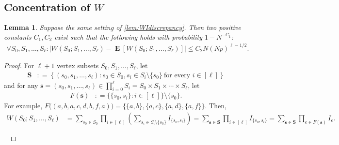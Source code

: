 \documentclass[letterpaper,11pt]{article}
\newtheorem{lemma}[theorem]{Lemma}
\newcommand{\W}{W}
\newcommand{\Ind}{I}
\newcommand{\Vsize}{N}
\newcommand{\pmax}{p}
\newcommand{\Slc}{\mathbf{S}}
\newcommand{\Vs}{U}
\newcommand{\Es}{F}
\DeclareMathOperator{\E}{\mathbf{E}}
\def\defeq{\mathrel{\mathop:}=}%
\begin{document}
\subsection[Concentration of W]{Concentration of $W$} \label{sec:W-EW}
%
\begin{lemma}
\label{lem:WEWdiscrepancy}
Suppose the same setting of \cref{lem:WIdiscrepancy}.
%
Then two positive constants $C_1, C_2$ exist such that the following holds with probability $1-\Vsize^{-C_1}$: 
\begin{align*}
\forall S_0, S_1, \ldots, S_\ell: 
\bigl|\W(S_0;S_1,\ldots,S_\ell)-\E[\W(S_0;S_1,\ldots,S_\ell)]\bigr|\leq  C_2 \Vsize(\Vsize \pmax)^{\ell-1/2}.
\end{align*}
\end{lemma}
\begin{proof}
For $\ell+1$ vertex subsets $S_0, S_1, \ldots, S_\ell$, let
\begin{align*}
\Slc&\defeq\left\{(s_0,s_1,\ldots,s_\ell): s_0\in S_0, s_i \in S_i\setminus \{s_0\}\ \textrm{for every $i\in [\ell]$}\right\}
\end{align*}
and for any $\mathbf{s}=(s_0, s_1,\ldots, s_\ell)\in \prod_{i=0}^\ell S_i=S_0 \times S_1\times \cdots \times S_\ell$, let 
\begin{align*}
\Es(\mathbf{s})&\defeq \bigl\{\{s_0,s_i\}: i\in [\ell] \bigr\}\setminus \{s_0\}. %
\end{align*}
For example, 
$\Es\bigl((a,b,a,c,d,b,f,a)\bigr)=\bigl\{\{a,b\},\{a,c\},\{a,d\},\{a,f\}\bigr\}$.
Then, %
\begin{align}
W(S_0;S_1,\ldots, S_\ell)
&=\sum_{s_0\in S_0}\prod_{i\in [\ell]}\left(\sum_{s_i\in S_i\setminus \{s_0\}}\Ind_{\{s_0,s_i\}}\right)
=\sum_{\mathbf{s}\in \Slc}\prod_{i\in [\ell]} \Ind_{\{s_0,s_i\}}
=\sum_{\mathbf{s}\in \Slc}\prod_{e\in \Es(\mathbf{s})} \Ind_{e}.
\label{eq:WtoJ}
\end{align}
%
%

\


\end{proof}
\end{document}
